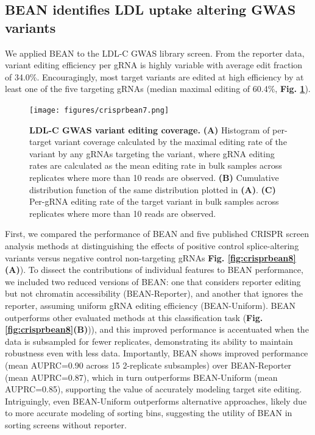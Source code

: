 \documentclass[a4paper, titlepage, openright]{book}
\begin{document}
\subsection{BEAN identifies LDL uptake altering GWAS variants}
We applied BEAN to the LDL-C GWAS library screen. From the reporter data, variant editing efficiency per gRNA is highly variable with average edit fraction of 34.0\%. Encouragingly, most target variants are edited at high efficiency by at least one of the five targeting gRNAs (median maximal editing of 60.4\%, \textbf{Fig. \ref{fig:crisprbean7}}). 
\begin{figure}
	\centering
	\texttt{[image: figures/crisprbean7.png]}
	\caption[LDL-C GWAS variant editing coverage]{\textbf{LDL-C GWAS variant editing coverage.} \textbf{(A)} Histogram of per-target variant coverage calculated by the maximal editing rate of the variant by any gRNAs targeting the variant, where gRNA editing rates are calculated as the mean editing rate in bulk samples across replicates where more than 10 reads are observed. \textbf{(B)} Cumulative distribution function of the same distribution plotted in \textbf{(A)}. \textbf{(C)} Per-gRNA editing rate of the target variant in bulk samples across replicates where more than 10 reads are observed. }
	\label{fig:crisprbean7}
\end{figure} 
First, we compared the performance of BEAN and five published CRISPR screen analysis methods at distinguishing the effects of positive control splice-altering variants versus negative control non-targeting gRNAs \citep{huang2021identification, li2014mageck, li2015quality, jeong2019beta, daley2018crisphiermix}  \textbf{Fig. \ref{fig:crisprbean8}(A)}). To dissect the contributions of individual features to BEAN performance, we included two reduced versions of BEAN: one that considers reporter editing but not chromatin accessibility (BEAN-Reporter), and another that ignores the reporter, assuming uniform gRNA editing efficiency (BEAN-Uniform). BEAN outperforms other evaluated methods at this classification task (\textbf{Fig. \ref{fig:crisprbean8}(B)})), and this improved performance is accentuated when the data is subsampled for fewer replicates, demonstrating its ability to maintain robustness even with less data. Importantly, BEAN shows improved performance (mean AUPRC=0.90 across 15 2-replicate subsamples) over BEAN-Reporter (mean AUPRC=0.87), which in turn outperforms BEAN-Uniform (mean AUPRC=0.85), supporting the value of accurately modeling target site editing. Intriguingly, even BEAN-Uniform outperforms alternative approaches, likely due to more accurate modeling of sorting bins, suggesting the utility of BEAN in sorting screens without reporter.
\end{document}
